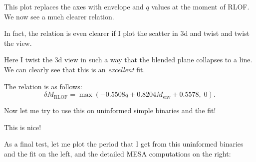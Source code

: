 \documentclass[a4paper,11pt]{article}
\begin{document}
\begin{figure}[ht]
	\centering
\end{figure}

This plot replaces the axes with envelope and \(q\) values at the moment of RLOF.
We now see a much clearer relation.

In fact, the relation is even clearer if I plot the scatter in 3d and twist and twist the view.
\vspace{-10pt}
\begin{figure}[ht]
	\centering
\end{figure}
\vspace{-30pt}
Here I twist the 3d view in such a way that the blended plane collapses to a line.
We can clearly see that this is an
\emph{excellent} fit.

The relation is as follows:
\begin{equation*}
	\delta M_\text{RLOF} = \max (-0.5508q + 0.8204 M_\text{env} + 0.5578,\; 0).
\end{equation*}

\nextpage

Now let me try to use this on uninformed simple binaries and the fit!

\begin{figure}[ht]
	\centering
\end{figure}

This is nice!

As a final test, let me plot the period that I get from this uninformed binaries and the fit on the left,
and the detailed MESA computations on the right:
\begin{figure}[ht]
	\centering
\end{figure}


\end{document}
